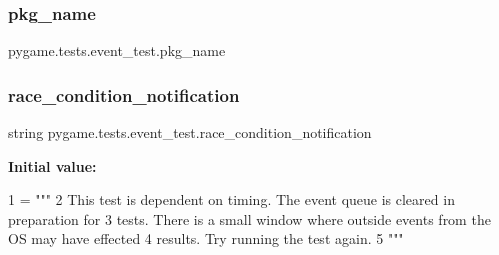 \subsubsection{\texorpdfstring{pkg\+\_\+name}{pkg\_name}}
{\footnotesize\ttfamily pygame.\+tests.\+event\+\_\+test.\+pkg\+\_\+name}

\mbox{\label{namespacepygame_1_1tests_1_1event__test_af80c2b5f40d90ad1bc3bf5f3a3ce7af9}} 
\subsubsection{\texorpdfstring{race\+\_\+condition\+\_\+notification}{race\_condition\_notification}}
{\footnotesize\ttfamily string pygame.\+tests.\+event\+\_\+test.\+race\+\_\+condition\+\_\+notification}

{\bfseries Initial value\+:}
\begin{DoxyCode}
1 =  \textcolor{stringliteral}{"""}
2 \textcolor{stringliteral}{This test is dependent on timing. The event queue is cleared in preparation for}
3 \textcolor{stringliteral}{tests. There is a small window where outside events from the OS may have effected}
4 \textcolor{stringliteral}{results. Try running the test again.}
5 \textcolor{stringliteral}{"""}
\end{DoxyCode}
